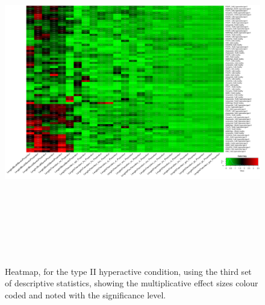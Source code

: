\documentclass[a4paper,12pt]{article}
\begin{document}
\begin{figure}[h!]
\begin{center}
\includegraphics[width=16cm,height=15cm]{DarkPTZ_heatmap_all_DarkPTZ_B1MAP.png}
\caption{Heatmap, for the type II hyperactive condition, using the third set of descriptive statistics, showing the multiplicative effect sizes colour coded and noted with the significance level.}
\end{center}
\end{figure}
\newpage
\end{document}
